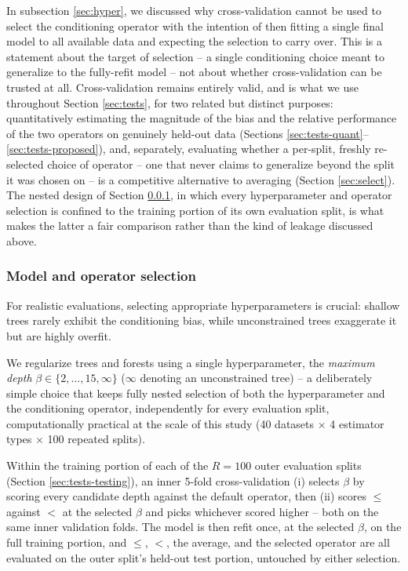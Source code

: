 \documentclass[5p,twocolumn,authoryear]{elsarticle}
\theoremstyle{plain}%
\theoremstyle{remark}%
\theoremstyle{definition}%
\begin{document}
In subsection \ref{sec:hyper}, we discussed why cross-validation cannot be used to select the conditioning operator with the intention of then fitting a single final model to all available data and expecting the selection to carry over. This is a statement about the target of selection -- a single conditioning choice meant to generalize to the fully-refit model -- not about whether cross-validation can be trusted at all. Cross-validation remains entirely valid, and is what we use throughout Section \ref{sec:tests}, for two related but distinct purposes: quantitatively estimating the magnitude of the bias and the relative performance of the two operators on genuinely held-out data (Sections \ref{sec:tests-quant}--\ref{sec:tests-proposed}), and, separately, evaluating whether a per-split, freshly re-selected choice of operator -- one that never claims to generalize beyond the split it was chosen on -- is a competitive alternative to averaging (Section \ref{sec:select}). The nested design of Section \ref{sec:tests-model}, in which every hyperparameter and operator selection is confined to the training portion of its own evaluation split, is what makes the latter a fair comparison rather than the kind of leakage discussed above.


\subsubsection{Model and operator selection}
\label{sec:tests-model}

For realistic evaluations, selecting appropriate hyperparameters is crucial: shallow trees rarely exhibit the conditioning bias, while unconstrained trees exaggerate it but are highly overfit.

We regularize trees and forests using a single hyperparameter, the \emph{maximum depth} $\beta \in \{2,\dots,15,\infty\}$ ($\infty$ denoting an unconstrained tree) -- a deliberately simple choice that keeps fully nested selection of both the hyperparameter and the conditioning operator, independently for every evaluation split, computationally practical at the scale of this study (40 datasets $\times$ 4 estimator types $\times$ 100 repeated splits).

Within the training portion of each of the $R=100$ outer evaluation splits (Section \ref{sec:tests-testing}), an inner 5-fold cross-validation (i) selects $\beta$ by scoring every candidate depth against the default operator, then (ii) scores $\leq$ against $<$ at the selected $\beta$ and picks whichever scored higher -- both on the same inner validation folds. The model is then refit once, at the selected $\beta$, on the full training portion, and $\leq$, $<$, the average, and the selected operator are all evaluated on the outer split's held-out test portion, untouched by either selection.
\end{document}
